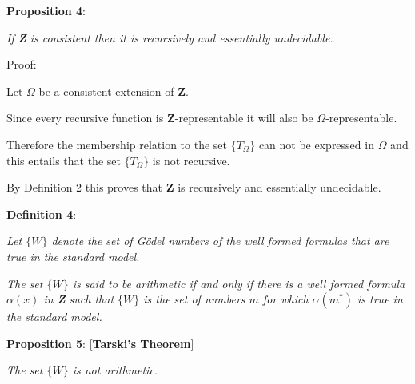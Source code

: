 \documentclass[12pt]{article}
\begin{document}
\textbf{Proposition 4}:

\begin{center}
\emph{If \textbf{Z} is consistent then it is recursively and essentially undecidable.}
\end{center}

Proof:

Let $\Omega$ be a consistent extension of \textbf{Z}.

Since every recursive function is \textbf{Z}-representable it will also be $\Omega$-representable.

Therefore the membership relation to the set $\{ T_{\Omega} \}$ can not be expressed in $\Omega$ and this entails that the set $\{ T_{\Omega} \}$ is not recursive.

By Definition 2 this proves that \textbf{Z} is recursively and essentially undecidable.

\textbf{Definition 4}:

\begin{center}
\emph{Let $\{ W \}$ denote the set of G\"odel numbers of the well formed formulas that are true in the standard model.}

\emph{The set $\{ W \}$ is said to be arithmetic if and only if there is a well formed formula $\alpha (x)$ in \textbf{Z} such that $\{ W \}$ is the set of numbers $m$ for which $\alpha (m^*)$ is true in the standard model.}
\end{center}

\textbf{Proposition 5}: [\textbf{Tarski's Theorem}]

\begin{center}                           
\emph{The set $\{ W \}$ is not arithmetic.}
\end{center}
\end{document}
